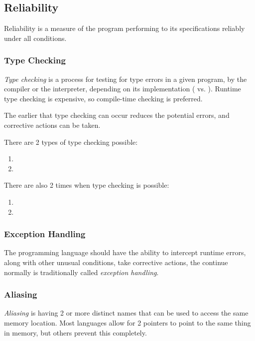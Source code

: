 \subsection{Reliability}\label{subsec:Reliability}
Reliability is a measure of the program performing to its specifications reliably under all conditions.

\subsubsection{Type Checking}\label{subsubsec:Type_Checking}
\begin{definition}\label{def:Type_Checking}
  \emph{Type checking} is a process for testing for type errors in a given program, by the compiler or the interpreter, depending on its implementation ( vs. ).
  Runtime type checking is expensive, so compile-time checking is preferred.

  \begin{remark}
    The earlier that type checking can occur reduces the potential errors, and corrective actions can be taken.
  \end{remark}

  There are 2 types of type checking possible:
  \begin{enumerate}[noitemsep]
  \item {}
  \item {}
  \end{enumerate}

  There are also 2 times when type checking is possible:
  \begin{enumerate}[noitemsep]
  \item {}
  \item {}
  \end{enumerate}
\end{definition}

\subsubsection{Exception Handling}\label{subsubsec:Exception_Handling}
The programming language should have the ability to intercept runtime errors, along with other unusual conditions, take corrective actions, the continue normally is traditionally called \emph{exception handling}.

\subsubsection{Aliasing}\label{subsubsec:Aliasing}
\begin{definition}[Aliasing]\label{def:Aliasing}
  \emph{Aliasing} is having 2 or more distinct names that can be used to access the same memory location.
  Most languages allow for 2 pointers to point to the same thing in memory, but others prevent this completely.
\end{definition}

